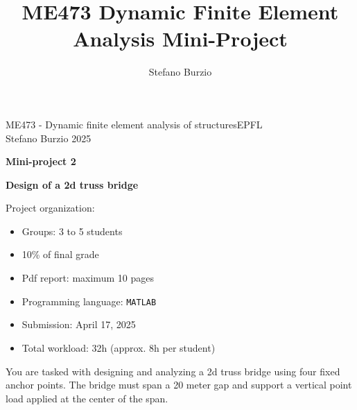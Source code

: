 \documentclass[12pt]{article}
\title{ME473 Dynamic Finite Element Analysis Mini-Project}
\author{Stefano Burzio}
\date{}
\begin{document}
\noindent ME473 - Dynamic finite element analysis of structures\hfill EPFL\\
Stefano Burzio \hfill 2025\\
\vspace{0.3cm}

\hspace*{\fill}\textbf{\Large Mini-project 2}\hspace*{\fill}
\begin{center}
  \textbf{\Large Design of a 2d truss bridge}
\end{center}

\hrulefill
\vspace{0.3cm}
\newline
{Project organization:}
\vspace{0.2cm}
\newline
\begin{minipage}[t]{0.38\textwidth}
  \begin{itemize}[itemsep=0.005cm]
    \item Groups: 3 to 5 students
    \item 10\% of final grade
    \item Pdf report: maximum 10 pages
  \end{itemize}
\end{minipage}
\hfill
\begin{minipage}[t]{0.58\textwidth}
  \begin{itemize}[itemsep=0.005cm]
    \item Programming language: \texttt{MATLAB}
    \item Submission: April 17, 2025
    \item Total workload:  32h (approx. 8h per student)
  \end{itemize}
\end{minipage}
\vspace{0.3cm}

\hrulefill
\vspace{0.3cm}

You are tasked with designing and analyzing a 2d truss bridge using four fixed anchor points. The bridge must span a 20 meter gap and support a vertical point load applied at the center of the span.
\end{document}
